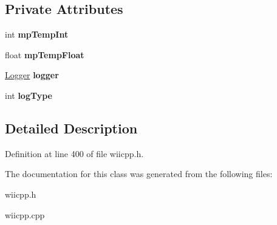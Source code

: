 \subsection*{Private Attributes}
\begin{DoxyCompactItemize}
\item 
\hypertarget{class_c_wiimote_aee9de2bf7c6e2d2933b2be46f21f4982}{int {\bfseries mp\-Temp\-Int}}\label{class_c_wiimote_aee9de2bf7c6e2d2933b2be46f21f4982}

\item 
\hypertarget{class_c_wiimote_a2617e6071bfc6712961d6b7edb79c2e5}{float {\bfseries mp\-Temp\-Float}}\label{class_c_wiimote_a2617e6071bfc6712961d6b7edb79c2e5}

\item 
\hypertarget{class_c_wiimote_a211cbf074ff990c86b441c84ad003493}{\hyperlink{class_logger}{Logger} {\bfseries logger}}\label{class_c_wiimote_a211cbf074ff990c86b441c84ad003493}

\item 
\hypertarget{class_c_wiimote_a9569ece9c54e7483b1f52a3a94ecc746}{int {\bfseries log\-Type}}\label{class_c_wiimote_a9569ece9c54e7483b1f52a3a94ecc746}

\end{DoxyCompactItemize}


\subsection{Detailed Description}


Definition at line 400 of file wiicpp.\-h.



The documentation for this class was generated from the following files\-:\begin{DoxyCompactItemize}
\item 
wiicpp.\-h\item 
wiicpp.\-cpp\end{DoxyCompactItemize}
